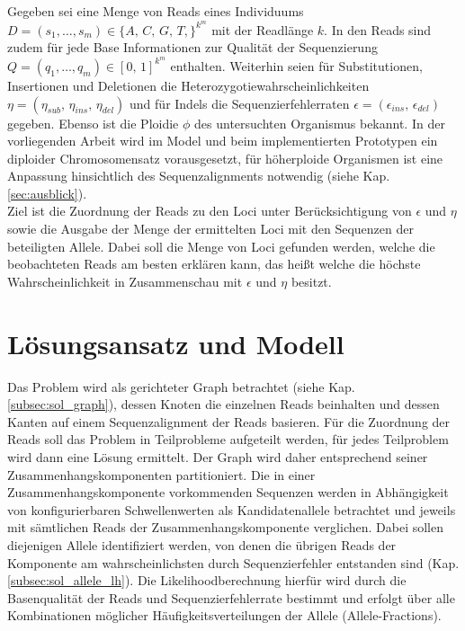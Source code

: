 Gegeben sei eine Menge von Reads eines Individuums $ D = (s_{1}, \dots , s_{m}) \in \{A,\,C,\,G,\,T,\}^{k^m}$ mit der Readlänge $k$. In den Reads sind zudem für jede Base Informationen zur Qualität der Sequenzierung $ Q = (q_{1}, \dots , q_{m}) \in {[0,\,1]}^{k^m}$ enthalten. Weiterhin seien für Substitutionen, Insertionen und Deletionen die Heterozygotiewahrscheinlichkeiten $\eta=(\eta_{sub},\, \eta_{ins},\, \eta_{del}) $ und für Indels die Sequenzierfehlerraten $\epsilon=(\epsilon_{ins},\, \epsilon_{del})$ gegeben. Ebenso ist die Ploidie $\phi$ des untersuchten Organismus bekannt. In der vorliegenden Arbeit wird im Model und beim implementierten Prototypen ein diploider Chromosomensatz vorausgesetzt, für höherploide Organismen ist eine Anpassung hinsichtlich des Sequenzalignments notwendig (siehe Kap. \ref{sec:ausblick}). \\

Ziel ist die Zuordnung der Reads zu den Loci unter Berücksichtigung von $\epsilon$ und $\eta$ sowie die Ausgabe der Menge der ermittelten Loci mit den Sequenzen der beteiligten Allele. Dabei soll die Menge von Loci gefunden werden, welche die beobachteten Reads am besten erklären kann, das heißt welche die höchste Wahrscheinlichkeit in Zusammenschau mit $\epsilon$ und $\eta$ besitzt. \\

\section{Lösungsansatz und Modell} \label{sec:solution}

Das Problem wird als gerichteter Graph betrachtet (siehe Kap. \ref{subsec:sol_graph}), dessen Knoten die einzelnen Reads beinhalten und dessen Kanten auf einem Sequenzalignment der Reads basieren. Für die Zuordnung der Reads soll das Problem in Teilprobleme aufgeteilt werden, für jedes Teilproblem wird dann eine Lösung ermittelt. Der Graph wird daher entsprechend seiner Zusammenhangskomponenten partitioniert. Die in einer Zusammenhangskomponente vorkommenden Sequenzen werden in Abhängigkeit von konfigurierbaren Schwellenwerten als Kandidatenallele betrachtet und jeweils mit sämtlichen Reads der Zusammenhangskomponente verglichen. Dabei sollen diejenigen Allele identifiziert werden, von denen die übrigen Reads der Komponente am wahrscheinlichsten durch Sequenzierfehler entstanden sind (Kap. \ref{subsec:sol_allele_lh}). Die Likelihoodberechnung hierfür wird durch die Basenqualität der Reads und Sequenzierfehlerrate bestimmt und erfolgt über alle Kombinationen möglicher Häufigkeitsverteilungen der Allele (Allele-Fractions). \\

